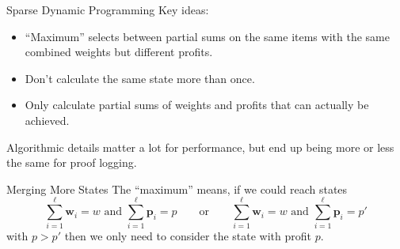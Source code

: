 \documentclass[aspectratio=169,compress,10pt]{beamer}
\begin{document}
\begin{frame}{Sparse Dynamic Programming}
    Key ideas:
    \begin{itemize}
        \item ``Maximum'' selects between partial sums on the same items with the same
            combined weights but different profits.
        \item Don't calculate the same state more than once.
        \item Only calculate partial sums of weights and profits that can actually be
            achieved.
    \end{itemize}
    \bigskip
    Algorithmic details matter a lot for performance, but end up being more or less the same for proof logging.
\end{frame}

\begin{frame}{Merging More States}
    The ``maximum'' means, if we could reach states \begin{equation*}
        \sum_{i=1}^{\ell} \boldsymbol{w}_i = w \text{~and~} \sum_{i=1}^{\ell} \boldsymbol{p}_i = p
        \qquad \text{or} \qquad
        \sum_{i=1}^{\ell} \boldsymbol{w}_i = w \text{~and~} \sum_{i=1}^{\ell} \boldsymbol{p}_i = p'
    \end{equation*}
    with $p > p'$ then we only need to consider the state with profit $p$.

    \bigskip

\end{frame}
\end{document}
